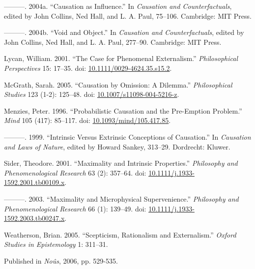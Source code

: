 \documentclass[
  11pt,
  letterpaper,
  DIV=11,
  numbers=noendperiod,
  twoside]{scrartcl}
\newlength{\cslhangindent}
\newenvironment{CSLReferences}[2] %
 {\begin{list}{}{%
  \setlength{\itemindent}{0pt}
  \setlength{\leftmargin}{0pt}
  \setlength{\parsep}{0pt}
  \ifodd #1
   \setlength{\leftmargin}{\cslhangindent}
   \setlength{\itemindent}{-1\cslhangindent}
  \fi
  \setlength{\itemsep}{#2\baselineskip}}}
 {\end{list}}
\begin{document}
\begin{CSLReferences}{1}{0}
---------. 2004a. {``Causation as Influence.''} In \emph{Causation and
Counterfactuals}, edited by John Collins, Ned Hall, and L. A. Paul,
75--106. Cambridge: {MIT} Press.

---------. 2004b. {``Void and Object.''} In \emph{Causation and
Counterfactuals}, edited by John Collins, Ned Hall, and L. A. Paul,
277--90. Cambridge: {MIT} Press.

Lycan, William. 2001. {``The Case for Phenomenal Externalism.''}
\emph{Philosophical Perspectives} 15: 17--35. doi:
\href{https://doi.org/10.1111/0029-4624.35.s15.2}{10.1111/0029-4624.35.s15.2}.

McGrath, Sarah. 2005. {``Causation by Omission: A Dilemma.''}
\emph{Philosophical Studies} 123 (1-2): 125--48. doi:
\href{https://doi.org/10.1007/s11098-004-5216-z}{10.1007/s11098-004-5216-z}.

Menzies, Peter. 1996. {``Probabilistic Causation and the Pre-Emption
Problem.''} \emph{Mind} 105 (417): 85--117. doi:
\href{https://doi.org/10.1093/mind/105.417.85}{10.1093/mind/105.417.85}.

---------. 1999. {``Intrinsic Versus Extrinsic Conceptions of
Causation.''} In \emph{Causation and Laws of Nature}, edited by Howard
Sankey, 313--29. Dordrecht: Kluwer.

Sider, Theodore. 2001. {``Maximality and Intrinsic Properties.''}
\emph{Philosophy and Phenomenological Research} 63 (2): 357--64. doi:
\href{https://doi.org/10.1111/j.1933-1592.2001.tb00109.x}{10.1111/j.1933-1592.2001.tb00109.x}.

---------. 2003. {``Maximality and Microphysical Supervenience.''}
\emph{Philosophy and Phenomenological Research} 66 (1): 139--49. doi:
\href{https://doi.org/10.1111/j.1933-1592.2003.tb00247.x}{10.1111/j.1933-1592.2003.tb00247.x}.

Weatherson, Brian. 2005. {``Scepticism, Rationalism and Externalism.''}
\emph{Oxford Studies in Epistemology} 1: 311--31.

\end{CSLReferences}



\noindent Published in\emph{
Noûs}, 2006, pp. 529-535.
\end{document}
